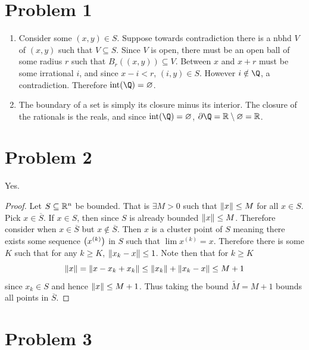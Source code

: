 \documentclass{eeleyes}
\newcommand\conj[1]{\overline{#1}}
\DeclareMathOperator{\interior}{int}
\begin{document}
\section*{Problem 1}
\begin{enumerate}[label=\alph*)]
    \item
        Consider some $(x, y) \in S$. Suppose towards contradiction there is a nbhd $V$ of $(x,y)$ such that $V \subseteq S$. Since $V$ is open, there must be an open ball of some radius $r$ such that $B_r((x,y)) \subseteq V$. Between $x$ and $x+r$ must be some irrational $i$, and since $x - i < r$, $(i, y) \in S$. However $i \notin \Q$, a contradiction. Therefore $\interior(\Q) = \varnothing$.
    \item 
        The boundary of a set is simply its closure minus its interior. The closure of the rationals is the reals, and since $\interior(\Q) = \varnothing$, $\partial \Q = \R \setminus \varnothing = \R$.
\end{enumerate}

\section*{Problem 2}
Yes.
\begin{proof}
    Let $S \subseteq \mathbb{R}^n$ be bounded. That is $\exists M > 0$ such that $\norm{x} \leq M$ for all $x \in S$. Pick $x \in \conj{S}$. If $x \in S$, then since $S$ is already bounded $\norm{x} \leq M$. Therefore consider when $x \in \conj{S}$ but $x \notin \conj{S}$. Then $x$ is a cluster point of $S$ meaning there exists some sequence $\qty(x^{(k)})$ in $S$ such that $\lim x^{(k)} = x$. Therefore there is some $K$ such that for any $k \geq K$, $\norm{x_k - x} \leq 1$. Note then that for $k \geq K$
    \[
        \norm{x} = \norm{x - x_k + x_k} \leq \norm{x_k} + \norm{x_k - x} \leq M + 1
    \]
    since $x_k \in S$ and hence $\norm{x} \leq M + 1$. Thus taking the bound $\tilde{M} = M + 1$ bounds all points in $\conj{S}$.
\end{proof}

\section*{Problem 3}
\end{document}
